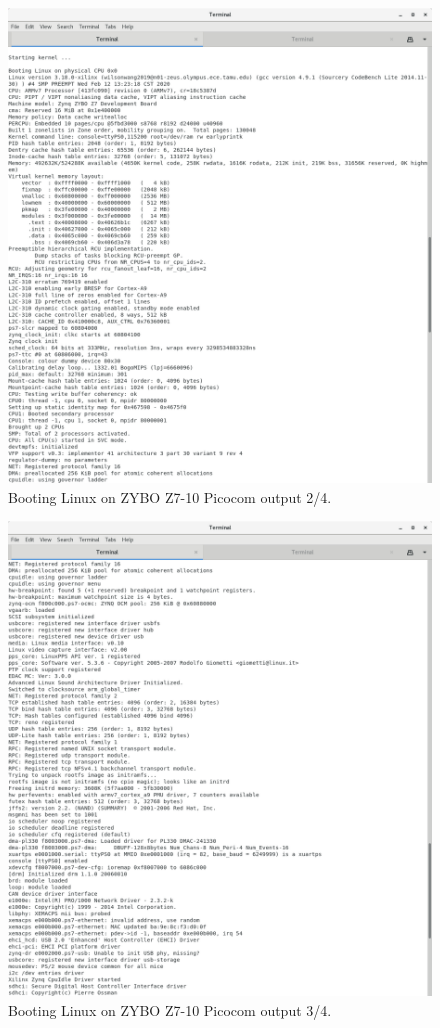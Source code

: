 \documentclass[11pt,letterpaper,titlepage]{article}
\begin{document}
\begin{figure}[h!]
    \centering
    \includegraphics[width=\textwidth]{boot_2.png}
    \caption{Booting Linux on ZYBO Z7-10 Picocom output 2/4.}
\end{figure}

\newpage

\begin{figure}[h!]
    \centering
    \includegraphics[width=\textwidth]{boot_3.png}
    \caption{Booting Linux on ZYBO Z7-10 Picocom output 3/4.}
\end{figure}
\end{document}
